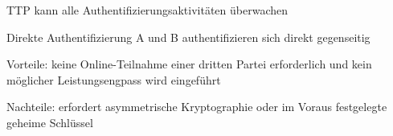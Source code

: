 \documentclass[a4paper]{article}
\makeatletter
\renewcommand{\subsection}{\@startsection{subsection}{2}{0mm}%
 {-1explus -.5ex minus -.2ex}%
 {0.5ex plus .2ex}%
 {\normalfont\normalsize\bfseries}}
\makeatother
\begin{document}
\begin{multicols}{3}
\begin{itemize*}
\begin{description*}
\begin{itemize*}
\begin{itemize*}
                              \item TTP kann alle Authentifizierungsaktivitäten überwachen
                        \end{itemize*}
                  \end{itemize*}
                  \item[Direkte Authentifizierung] A und B authentifizieren sich direkt gegenseitig
                  \begin{itemize*}
                        \item Vorteile: keine Online-Teilnahme einer dritten Partei erforderlich und kein möglicher Leistungsengpass wird eingeführt
                        \item Nachteile: erfordert asymmetrische Kryptographie oder im Voraus festgelegte geheime Schlüssel
                  \end{itemize*}
            \end{description*}
      \end{itemize*}
      \columnbreak



\end{multicols}
\end{document}
